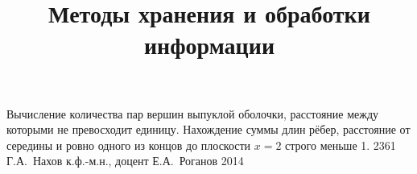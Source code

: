 \documentclass[a4paper,12pt]{memoir}
\begin{document}
\renewcommand{\contentsname}{{\Large{Содержание}\hfill}}

\title{Методы хранения и обработки информации}
{Вычисление количества пар вершин выпуклой оболочки, расстояние между которыми не превосходит единицу. Нахождение суммы длин рёбер, расстояние от середины и ровно одного из концов до плоскости $\mathit x = 2$ строго меньше 1.}
{2361}
{Г.\+А.~Нахов}
{к.ф.-м.н., доцент}
{Е.\+А.~Роганов}
{2014}





\newpage


\end{document}
